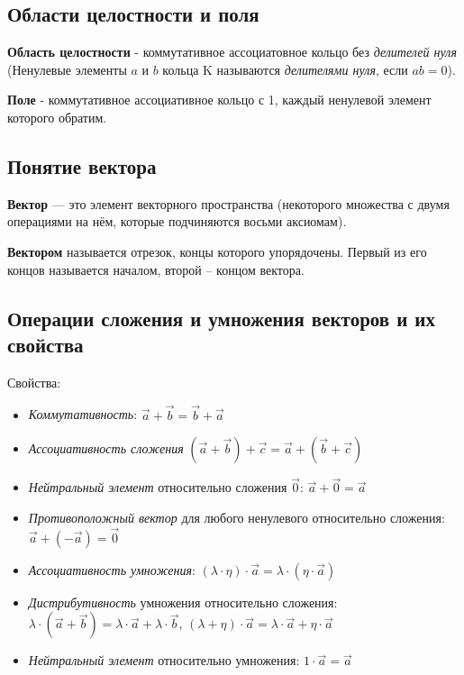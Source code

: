\documentclass[a4paper]{article}
\begin{document}
    \subsection*{Области целостности и поля}
    \textbf{Область целостности} - коммутативное ассоциатовное кольцо без \textit{делителей нуля} (Ненулевые элементы $a$ и $b$ кольца K называются \textit{делителями нуля}, если $ab = 0$).

    \textbf{Поле} - коммутативное ассоциативное кольцо с 1, каждый ненулевой элемент которого обратим.



    \newpage \begin{center}
                 \begin{Large}
                 \end{Large}
    \end{center}
    \subsection*{Понятие вектора}
    \textbf{Вектор} — это элемент векторного пространства (некоторого множества с двумя операциями на нём, которые подчиняются восьми аксиомам).

    \textbf{Вектором} называется отрезок,
    концы которого упорядочены. Первый из его концов
    называется началом, второй – концом вектора.

    \subsection*{Операции сложения и умножения векторов и их свойства}

    Свойства:
    \begin{itemize}
        \item \textit{Коммутативность}: $\vec{a} + \vec{b} = \vec{b} + \vec{a}$
        \item \textit{Ассоциативность сложения} $(\vec{a} + \vec{b}) + \vec{c} = \vec{a} + (\vec{b}+\vec{c})$
        \item \textit{Нейтральный элемент} относительно сложения $\vec{0}$: $\vec{a} + \vec{0} = \vec{a}$
        \item \textit{Противоположный вектор} для любого ненулевого относительно сложения: $\vec{a}+(-\vec{a}) = \vec{0}$
        \item \textit{Ассоциативность умножения}: $(\lambda \cdot \eta) \cdot \vec{a} = \lambda \cdot ( \eta \cdot \vec{a})$
        \item \textit{Дистрибутивность} умножения относительно сложения: $\lambda \cdot (\vec{a} + \vec{b}) = \lambda \cdot \vec{a} + \lambda \cdot \vec{b}$, $(\lambda + \eta) \cdot \vec{a} = \lambda \cdot \vec{a} + \eta \cdot \vec{a}$
        \item \textit{Нейтральный элемент} относительно умножения: $1 \cdot \vec{a} = \vec{a}$
    \end{itemize}
\end{document}
